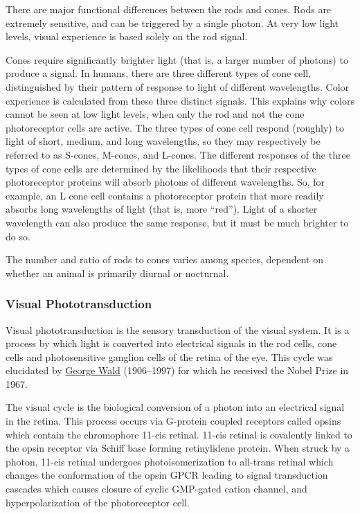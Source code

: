 There are major functional differences between the rods and cones. Rods
are extremely sensitive, and can be triggered by a single photon. At
very low light levels, visual experience is based solely on the rod
signal.

Cones require significantly brighter light (that is, a larger number of
photons) to produce a signal. In humans, there are three different types
of cone cell, distinguished by their pattern of response to light of
different wavelengths. Color experience is calculated from these three
distinct signals. This explains why colors cannot be seen at low light
levels, when only the rod and not the cone photoreceptor cells are
active. The three types of cone cell respond (roughly) to light of
short, medium, and long wavelengths, so they may respectively be
referred to as S-cones, M-cones, and L-cones. The different responses of
the three types of cone cells are determined by the likelihoods that
their respective photoreceptor proteins will absorb photons of different
wavelengths. So, for example, an L cone cell contains a photoreceptor
protein that more readily absorbs long wavelengths of light (that is,
more ``red''). Light of a shorter wavelength can also produce the same
response, but it must be much brighter to do so.

The number and ratio of rods to cones varies among species, dependent on
whether an animal is primarily diurnal or nocturnal.

\hypertarget{visual-phototransduction}{%
\subsubsection{Visual
Phototransduction}\label{visual-phototransduction}}

Visual phototransduction is the sensory transduction of the visual
system. It is a process by which light is converted into electrical
signals in the rod cells, cone cells and photosensitive ganglion cells
of the retina of the eye. This cycle was elucidated by
\href{https://en.wikipedia.org/wiki/George_Wald}{George Wald}
(1906--1997) for which he received the Nobel Prize in 1967.

The visual cycle is the biological conversion of a photon into an
electrical signal in the retina. This process occurs via G-protein
coupled receptors called opsins which contain the chromophore 11-cis
retinal. 11-cis retinal is covalently linked to the opsin receptor via
Schiff base forming retinylidene protein. When struck by a photon,
11-cis retinal undergoes photoisomerization to all-trans retinal which
changes the conformation of the opsin GPCR leading to signal
transduction cascades which causes closure of cyclic GMP-gated cation
channel, and hyperpolarization of the photoreceptor cell.

